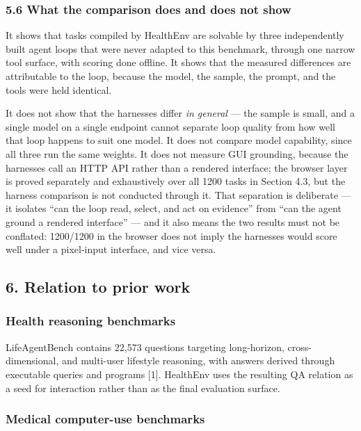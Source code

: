 \documentclass[
]{article}
\begin{document}
\subsubsection{5.6 What the comparison does and does not
show}\label{what-the-comparison-does-and-does-not-show}

It shows that tasks compiled by HealthEnv are solvable by three
independently built agent loops that were never adapted to this
benchmark, through one narrow tool surface, with scoring done offline.
It shows that the measured differences are attributable to the loop,
because the model, the sample, the prompt, and the tools were held
identical.

It does not show that the harnesses differ \emph{in general} --- the
sample is small, and a single model on a single endpoint cannot separate
loop quality from how well that loop happens to suit one model. It does
not compare model capability, since all three run the same weights. It
does not measure GUI grounding, because the harnesses call an HTTP API
rather than a rendered interface; the browser layer is proved separately
and exhaustively over all 1200 tasks in Section 4.3, but the harness
comparison is not conducted through it. That separation is deliberate
--- it isolates ``can the loop read, select, and act on evidence'' from
``can the agent ground a rendered interface'' --- and it also means the
two results must not be conflated: 1200/1200 in the browser does not
imply the harnesses would score well under a pixel-input interface, and
vice versa.

\subsection{6. Relation to prior work}\label{relation-to-prior-work}

\subsubsection{Health reasoning
benchmarks}\label{health-reasoning-benchmarks}

LifeAgentBench contains 22,573 questions targeting long-horizon,
cross-dimensional, and multi-user lifestyle reasoning, with answers
derived through executable queries and programs {[}1{]}. HealthEnv uses
the resulting QA relation as a seed for interaction rather than as the
final evaluation surface.

\subsubsection{Medical computer-use
benchmarks}\label{medical-computer-use-benchmarks}
\end{document}
